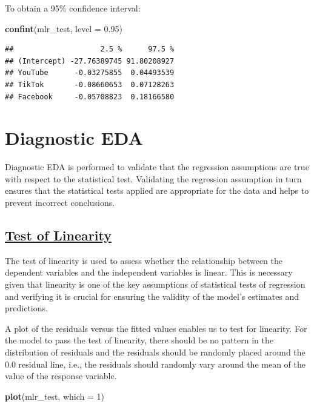 \documentclass[
]{article}
\newenvironment{Shaded}{\begin{snugshade}}{\end{snugshade}}
\newcommand{\AttributeTok}[1]{\textcolor[rgb]{0.13,0.29,0.53}{#1}}
\newcommand{\DecValTok}[1]{\textcolor[rgb]{0.00,0.00,0.81}{#1}}
\newcommand{\FloatTok}[1]{\textcolor[rgb]{0.00,0.00,0.81}{#1}}
\newcommand{\FunctionTok}[1]{\textcolor[rgb]{0.13,0.29,0.53}{\textbf{#1}}}
\newcommand{\NormalTok}[1]{#1}
\begin{document}
To obtain a 95\% confidence interval:

\begin{Shaded}
\begin{Highlighting}[]
\FunctionTok{confint}\NormalTok{(mlr\_test, }\AttributeTok{level =} \FloatTok{0.95}\NormalTok{)}
\end{Highlighting}
\end{Shaded}

\begin{verbatim}
##                    2.5 %      97.5 %
## (Intercept) -27.76389745 91.80208927
## YouTube      -0.03275855  0.04493539
## TikTok       -0.08660653  0.07128263
## Facebook     -0.05708823  0.18166580
\end{verbatim}

\section{Diagnostic EDA}\label{diagnostic-eda}

Diagnostic EDA is performed to validate that the regression assumptions
are true with respect to the statistical test. Validating the regression
assumption in turn ensures that the statistical tests applied are
appropriate for the data and helps to prevent incorrect conclusions.

\subsection{\texorpdfstring{\ul{\textbf{Test of
Linearity}}}{Test of Linearity}}\label{test-of-linearity}

The test of linearity is used to assess whether the relationship between
the dependent variables and the independent variables is linear. This is
necessary given that linearity is one of the key assumptions of
statistical tests of regression and verifying it is crucial for ensuring
the validity of the model's estimates and predictions.

A plot of the residuals versus the fitted values enables us to test for
linearity. For the model to pass the test of linearity, there should be
no pattern in the distribution of residuals and the residuals should be
randomly placed around the 0.0 residual line, i.e., the residuals should
randomly vary around the mean of the value of the response variable.

\begin{Shaded}
\begin{Highlighting}[]
\FunctionTok{plot}\NormalTok{(mlr\_test, }\AttributeTok{which =} \DecValTok{1}\NormalTok{)}
\end{Highlighting}
\end{Shaded}
\end{document}
